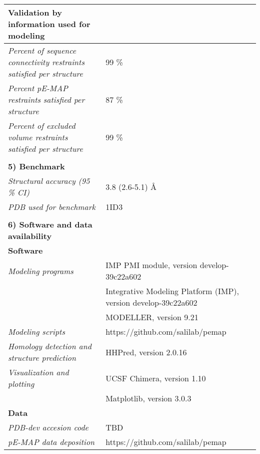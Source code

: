 \documentclass[8pt,a4paper]{article}
\begin{document}
\begin{longtable}{ p{} | p{} }
  \textbf{Validation by information used for modeling} & \\
  \hline
          \textit{Percent of sequence connectivity restraints satisfied per structure} & 99 \%\\
                \textit{Percent pE-MAP restraints satisfied per structure} & 87 \%\\
                \textit{Percent of excluded volume restraints satisfied per structure} & 99 \%\\
          &  \\
  
  \textbf{5) Benchmark} & \\
  \hline
          \textit{Structural accuracy (95 \% CI)} & 3.8 (2.6-5.1) \AA\\
                \textit{PDB used for benchmark} & 1ID3\\
          
   &  \\
  \normalsize{\textbf{6) Software and data availability}} & \\
    \hline
   \textbf{Software} & \\
   \hline
             \textit{Modeling programs} & IMP PMI module, version develop-39c22a602\\
             & Integrative Modeling Platform (IMP), version develop-39c22a602 \\
             & MODELLER, version 9.21 \\
                  \textit{Modeling scripts} & https://github.com/salilab/pemap\\
                  \textit{Homology detection and structure prediction} & HHPred, version 2.0.16\\
                  \textit{Visualization and plotting} & UCSF Chimera, version 1.10\\
             & Matplotlib, version 3.0.3  \\
          \hline

  \textbf{Data} & \\
    \hline
            \textit{PDB-dev accesion code} & TBD\\
                  \textit{pE-MAP data deposition} & https://github.com/salilab/pemap\\
          \hline
  
\end{longtable}
\end{document}
